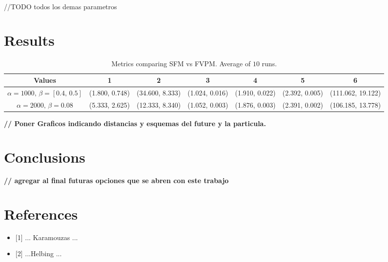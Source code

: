 \documentclass[english]{article}
\providecommand{\tabularnewline}{\\}
\numberwithin{equation}{section}
\numberwithin{figure}{section}
\begin{document}
//TODO todos los demas parametros


\section{Results}

\vspace{1cm}


\begin{table}[H]
\centering{}{\scriptsize{}}%
\begin{tabular}{|c|c|c|c|c|c|c|}
\hline 
{\scriptsize{}Values} & {\scriptsize{}1} & {\scriptsize{}2} & {\scriptsize{}3} & {\scriptsize{}4} & {\scriptsize{}5} & {\scriptsize{}6}\tabularnewline
\hline 
\hline 
{\scriptsize{}$\alpha=1000,\,\beta=[0.4,\,0.5]$} & {\scriptsize{}(1.800, 0.748) } & {\scriptsize{}(34.600, 8.333) } & {\scriptsize{}(1.024, 0.016) } & {\scriptsize{}(1.910, 0.022) } & {\scriptsize{}(2.392, 0.005) } & {\scriptsize{}(111.062, 19.122)}\tabularnewline
\hline 
{\scriptsize{}$\alpha=2000,\,\beta=0.08$} & {\scriptsize{}(5.333, 2.625)} & {\scriptsize{}(12.333, 8.340) } & {\scriptsize{}(1.052, 0.003) } & {\scriptsize{}(1.876, 0.003) } & {\scriptsize{}(2.391, 0.002) } & {\scriptsize{}(106.185, 13.778)}\tabularnewline
\hline 
\end{tabular}\protect\caption{Metrics comparing SFM vs FVPM. Average of $10$ runs.}
\end{table}




\textbf{// Poner Graficos indicando distancias y esquemas del future
y la particula. }


\section{Conclusions}

\textbf{// agregar al final futuras opciones que se abren con este
trabajo}

\pagebreak{}


\section{References}
\begin{itemize}
\item {[}1{]} ... Karamouzas ...
\item {[}2{]} ...Helbing ...\end{itemize}
\end{document}

